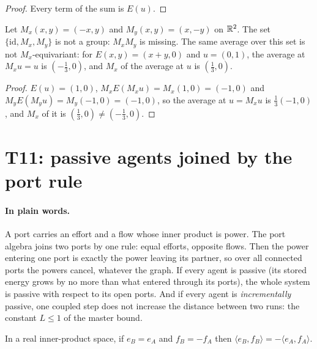\begin{proof}
  \leanok
  Every term of the sum is $E(u)$.
\end{proof}

\begin{example}\label{ex:T10-nongroup}
  \leanok
  Let $M_x(x,y)=(-x,y)$ and $M_y(x,y)=(x,-y)$ on $\mathbb{R}^2$.  The set
  $\{\mathrm{id},M_x,M_y\}$ is not a group: $M_xM_y$ is missing.  The same
  average over this set is not $M_x$-equivariant: for $E(x,y)=(x+y,0)$ and
  $u=(0,1)$, the average at $M_xu=u$ is $(-\tfrac13,0)$, and $M_x$ of the
  average at $u$ is $(\tfrac13,0)$.
\end{example}

\begin{proof}
  \leanok
  $E(u)=(1,0)$, $M_xE(M_xu)=M_x(1,0)=(-1,0)$ and $M_yE(M_yu)=M_y(-1,0)=(-1,0)$,
  so the average at $u=M_xu$ is $\tfrac13(-1,0)$, and $M_x$ of it is
  $(\tfrac13,0)\ne(-\tfrac13,0)$.
\end{proof}

\section{T11: passive agents joined by the port rule}

\paragraph{In plain words.}
A port carries an effort and a flow whose inner product is power.  The port
algebra joins two ports by one rule: equal efforts, opposite flows.  Then the
power entering one port is exactly the power leaving its partner, so over all
connected ports the powers cancel, whatever the graph.  If every agent is
passive (its stored energy grows by no more than what entered through its
ports), the whole system is passive with respect to its open ports.  And if
every agent is \emph{incrementally} passive, one coupled step does not increase
the distance between two runs: the constant $L\le1$ of the master bound.

\begin{lemma}\label{lem:T11-rule}
  \leanok
  In a real inner-product space, if $e_B=e_A$ and $f_B=-f_A$ then
  $\langle e_B,f_B\rangle=-\langle e_A,f_A\rangle$.
\end{lemma}

